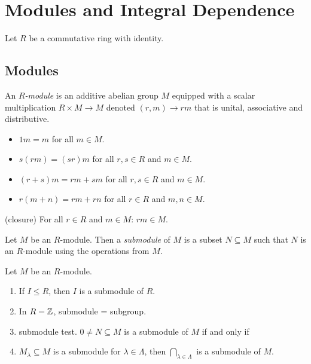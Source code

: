 \chapter{Modules and Integral Dependence}

Let $R$ be a commutative ring with identity.

\section{Modules}

\begin{definition}
    An \emph{$R$-module} is an additive abelian group $M$ equipped with a scalar multiplication $R \times M \to M$ denoted $(r,m) \to rm$ that is unital, associative and distributive.
    \begin{itemize}
        \item $1m = m$ for all $m \in M$.
        \item $s(rm) = (sr)m$ for all $r,s \in R$ and $m \in M$.
        \item $(r+s)m = rm + sm$ for all $r,s \in R$ and $m \in M$.
        \item $r(m+n) = rm + rn$ for all $r \in R$ and $m,n \in M$.
    \end{itemize}
    \quad (closure) For all $r \in R$ and $m \in M$: $rm \in M$.
\end{definition}

\begin{example}
\end{example}

\begin{definition}
    Let $M$ be an $R$-module. Then a \emph{submodule} of $M$ is a subset $N \subseteq M$ such that $N$ is an $R$-module using the operations from $M$.
\end{definition}

\noindent Let $M$ be an $R$-module.

\begin{example}
    \begin{enumerate}
        \item If $I \leq R$, then $I$ is a submodule of $R$.
        \item In $R = \mathbb{Z}$, submodule = subgroup.
        \item submodule test. $0 \neq N \subseteq M$ is a submodule of $M$ if and only if 
        \item $M_\lambda \subseteq M$ is a submodule for $\lambda \in \Lambda$, then $\bigcap_{\lambda \in \Lambda}$ is a submodule of $M$.
    \end{enumerate}
\end{example}

